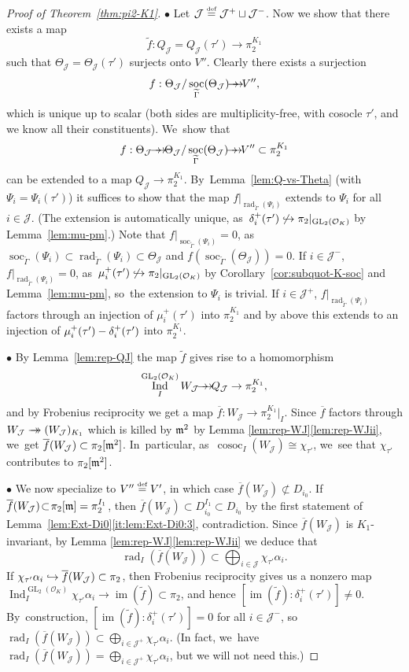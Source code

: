 \documentclass[JEP,XML,SOM,Unicode,NoFloatCountersInSection, NoEqCountersInSection,published]{cedram}
\newcommand\hto{\mathrel{\lhook\joinrel\to}}
\newcommand{\onto}{\mathchoice{\to\hspace*{-5mm}\to}{\mathrel{\hbox{$\to\hspace*{-2.85mm}\to$}}}{\to\hspace*{-3mm}\to}{\to\hspace*{-3mm}\to}}
\newcommand{\sbullet}{{\scriptscriptstyle\bullet}}
\let\wt\widetilde
\let\ovl\overline
\newcommand{\defeq}{\stackrel{\textrm{\tiny{\upshape{def}}}}{=}}
\newcommand{\cJ}{{\mathcal{J}}}
\newcommand{\cO}{\mathcal{O}}
\DeclareMathOperator{\cosoc}{cosoc}
\DeclareMathOperator{\GL}{GL}
\DeclareMathOperator{\im}{im}
\DeclareMathOperator{\Ind}{Ind}
\DeclareMathOperator{\rad}{rad}
\DeclareMathOperator{\soc}{soc}
\theoremstyle{plain}
\theoremstyle{definition}
\begin{document}
\begin{proof}[Proof of Theorem~\ref{thm:pi2-K1}]
$\sbullet$ Let $\cJ \defeq \cJ^+ \sqcup \cJ^-$.
Now we show that there exists a map
\[
\wt f: Q_\cJ=Q_\cJ(\tau') \to \pi_2^{K_1}
\]
such that $\Theta_\cJ=\Theta_\cJ(\tau')$ surjects onto $V''$.
Clearly there exists a surjection
\[
f: \Theta_{\cJ}/\soc_{\wt\Gamma}(\Theta_{\cJ}) \onto V'',
\]
which is unique up to scalar (both sides are multiplicity-free, with cosocle $\tau'$, and we know all their constituents). We~show that
\[
f: \Theta_\cJ \onto \Theta_{\cJ}/\soc_{\wt\Gamma}(\Theta_{\cJ})\onto V'' \subset \pi_2^{K_1}
\]
can be extended to a map $Q_\cJ \to \pi_2^{K_1}$. By~Lemma~\ref{lem:Q-vs-Theta} (with $\Psi_i = \Psi_i(\tau')$) it suffices to show that the map $f|_{\rad_{\wt\Gamma}(\Psi_i)}$ extends to $\Psi_i$ for all $i \in \cJ$.
(The extension is automatically unique, as~$\delta_i^+(\tau') \not\hto \pi_2|_{\GL_2(\cO_K)}$ by Lemma~\ref{lem:mu-pm}.)
Note that $f|_{\soc_{\wt\Gamma}(\Psi_i)} = 0$, as~$\soc_{\wt\Gamma}(\Psi_i) \subset \rad_{\wt\Gamma}(\Psi_i) \subset \Theta_\cJ$ and $f(\soc_{\wt\Gamma}(\Theta_\cJ)) = 0$.
If $i \in \cJ^-$, $f|_{\rad_{\wt\Gamma}(\Psi_i)} = 0$, as~$\mu_i^+(\tau') \not\hto \pi_2|_{\GL_2(\cO_K)}$ by Corollary~\ref{cor:subquot-K-soc} and Lemma~\ref{lem:mu-pm}, so~the extension to $\Psi_i$ is trivial.
If $i \in \cJ^+$, $f|_{\rad_{\wt\Gamma}(\Psi_i)}$ factors through an injection of $\mu_i^+(\tau')$ into $\pi_2^{K_1}$ and by above this extends to an injection of $\mu_i^+(\tau') \-- \delta_i^+(\tau')$ into $\pi_2^{K_1}$.

$\sbullet$ By Lemma~\ref{lem:rep-QJ} the map $\wt f$ gives rise to a homomorphism
\[
\Ind_I^{\GL_2(\cO_K)} W_\cJ \onto Q_\cJ \to \pi_2^{K_1},
\]
and by Frobenius reciprocity we get a map $\ovl f: W_\cJ \to \pi_2^{K_1}|_I$. {Since $\ovl{f}$ factors through $W_{\cJ}\onto (W_{\cJ})_{K_1}$ which is killed by $\mathfrak{m}^2$ by Lemma \ref{lem:rep-WJ}\eqref{lem:rep-WJii}, we~get $\ovl{f}(W_{\cJ})\subset \pi_2[\m^2]$. In~particular, as~$\cosoc_I(W_{\cJ})\cong\chi_{\tau'}$, we~see that $\chi_{\tau'}$ contributes to $\pi_2[\mathfrak{m}^2]$.}

$\sbullet$ We now specialize to $V'' \defeq V'$, in which case $\ovl f(W_\cJ) \!\not\subset\! D_{i_0}$. If $\ovl f(W_\cJ) \!\subset\! \pi_2[\m] = \pi_2^{I_1}$, then $\ovl f(W_\cJ) \!\subset\! D_{i_0}^{I_1} \!\subset\! D_{i_0}$ by the first statement of Lemma~\ref{lem:Ext-Di0}\eqref{it:lem:Ext-Di0:3}, contradiction. Since $\ovl f(W_\cJ)$ is $K_1$-invariant, by Lemma \ref{lem:rep-WJ}\eqref{lem:rep-WJii} we deduce that
\[
\rad_I(\ovl f(W_\cJ)) \subset \bigoplus_{i \in \cJ} \chi_{\tau'} \alpha_i.
\]
If $\chi_{\tau'} \alpha_i \hto \ovl f(W_\cJ) \subset \pi_2$, then Frobenius reciprocity gives us a nonzero map $\Ind_I^{\GL_2(\cO_K)} \chi_{\tau'}\alpha_i \to \im(\wt f) \subset \pi_2$, and hence $[\im(\wt f): \delta_i^+(\tau')] \ne 0$. By~construction, $[\im(\wt f): \delta_i^+(\tau')] = 0$ for all $i \in \cJ^-$, so~$\rad_I(\ovl f(W_\cJ)) \subset \bigoplus_{i \in \cJ^+} \chi_{\tau'} \alpha_i$. (In fact, we~have $\rad_I(\ovl f(W_\cJ)) = \bigoplus_{i \in \cJ^+} \chi_{\tau'} \alpha_i$, but we will not need this.)


\end{proof}
\end{document}
